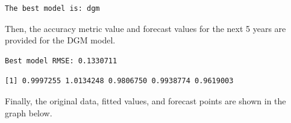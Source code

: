 \documentclass[
  11pt,
  a4paper,
  DIV=11,
  numbers=noendperiod]{scrartcl}
\newenvironment{Shaded}{\begin{snugshade}}{\end{snugshade}}
\newcommand{\ControlFlowTok}[1]{\textcolor[rgb]{0.00,0.23,0.31}{#1}}
\newcommand{\FunctionTok}[1]{\textcolor[rgb]{0.28,0.35,0.67}{#1}}
\newcommand{\NormalTok}[1]{\textcolor[rgb]{0.00,0.23,0.31}{#1}}
\newcommand{\OtherTok}[1]{\textcolor[rgb]{0.00,0.23,0.31}{#1}}
\newcommand{\SpecialCharTok}[1]{\textcolor[rgb]{0.37,0.37,0.37}{#1}}
\newcommand{\StringTok}[1]{\textcolor[rgb]{0.13,0.47,0.30}{#1}}
\begin{document}
\begin{Shaded}
\end{Shaded}

\begin{verbatim}
The best model is: dgm 
\end{verbatim}

Then, the accuracy metric value and forecast values for the next 5 years
are provided for the DGM model.

\begin{Shaded}
\end{Shaded}

\begin{verbatim}
Best model RMSE: 0.1330711 
\end{verbatim}

\begin{Shaded}
\end{Shaded}

\begin{verbatim}
[1] 0.9997255 1.0134248 0.9806750 0.9938774 0.9619003
\end{verbatim}

Finally, the original data, fitted values, and forecast points are shown
in the graph below.
\end{document}
